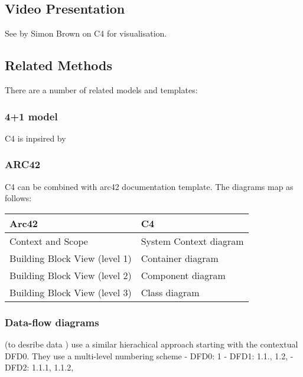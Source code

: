 \documentclass[letterpaper,10pt,english]{sphinxmanual}
\begin{document}
\subsection{Video Presentation}
\label{\detokenize{C4/c4:video-presentation}}
See  by Simon
Brown on C4 for visualisation.


\subsection{Related Methods}
\label{\detokenize{C4/c4:related-methods}}
There are a number of related models and templates:


\subsubsection{4+1 model}
\label{\detokenize{C4/c4:model}}
C4 is inpsired by 


\subsubsection{ARC42}
\label{\detokenize{C4/c4:arc42}}
C4 can be combined with arc42 documentation template. The diagrams map
as follows:


\begin{savenotes}\sphinxattablestart
\centering
\begin{tabulary}{\linewidth}[t]{|T|T|}
\hline
\sphinxstyletheadfamily 
Arc42
&\sphinxstyletheadfamily 
C4
\\
\hline
Context and Scope
&
System Context diagram
\\
\hline
Building Block View (level 1)
&
Container diagram
\\
\hline
Building Block View (level 2)
&
Component diagram
\\
\hline
Building Block View (level 3)
&
Class diagram
\\
\hline
\end{tabulary}
\par
\sphinxattableend\end{savenotes}


\subsubsection{Data-flow diagrams}
\label{\detokenize{C4/c4:data-flow-diagrams}}
 (to desribe
data ) use a similar hierachical approach starting with the
contextual DFD0. They use a multi-level numbering scheme - DFD0: 1 -
DFD1: 1.1., 1.2, - DFD2: 1.1.1, 1.1.2,
\end{document}
